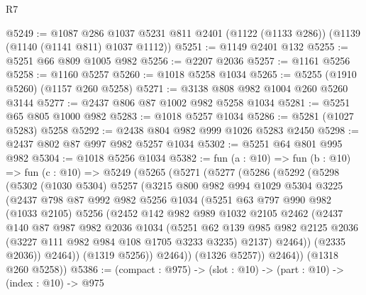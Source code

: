 \begin{lexlean}{R7}
\begin{coremodule}
@5249 := @1087
    @286
    @1037
    @5231
    @811
    @2401
    (@1122 (@1133 @286))
    (@1139 (@1140 (@1141 @811) @1037 @1112))
@5251 := @1149 @2401 @132
@5255 := @5251 @66 @809 @1005 @982
@5256 := @2207 @2036
@5257 := @1161 @5256
@5258 := @1160 @5257
@5260 := @1018 @5258 @1034
@5265 := @5255 (@1910 @5260) (@1157 @260 @5258)
@5271 := @3138 @808 @982 @1004 @260 @5260 @3144
@5277 := @2437 @806 @87 @1002 @982 @5258 @1034
@5281 := @5251 @65 @805 @1000 @982
@5283 := @1018 @5257 @1034
@5286 := @5281 (@1027 @5283) @5258
@5292 := @2438 @804 @982 @999 @1026 @5283 @2450
@5298 := @2437 @802 @87 @997 @982 @5257 @1034
@5302 := @5251 @64 @801 @995 @982
@5304 := @1018 @5256 @1034
@5382 := fun (a : @10) =>
  fun (b : @10) =>
  fun (c : @10) =>
  @5249
    (@5265
      (@5271
        (@5277
          (@5286
            (@5292
              (@5298
                (@5302
                  (@1030 @5304)
                  @5257
                  (@3215
                    @800
                    @982
                    @994
                    @1029
                    @5304
                    @3225
                    (@2437
                      @798
                      @87
                      @992
                      @982
                      @5256
                      @1034
                      (@5251
                        @63
                        @797
                        @990
                        @982
                        (@1033 @2105)
                        @5256
                        (@2452
                          @142
                          @982
                          @989
                          @1032
                          @2105
                          @2462
                          (@2437
                            @140
                            @87
                            @987
                            @982
                            @2036
                            @1034
                            (@5251
                              @62
                              @139
                              @985
                              @982
                              @2125
                              @2036
                              (@3227 @111 @982 @984 @108 @1705 @3233 @3235)
                              @2137)
                            @2464))
                        (@2335 @2036))
                      @2464))
                  (@1319 @5256))
                @2464))
            (@1326 @5257))
          @2464))
      (@1318 @260 @5258))
@5386 := (compact : @975) -> (slot : @10) -> (part : @10) -> (index : @10) -> @975

\end{coremodule}
\end{lexlean}
